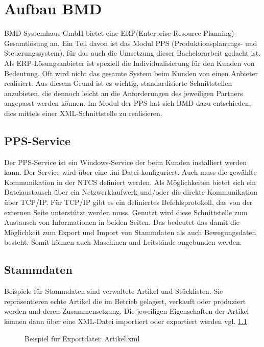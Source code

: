 \chapter{Aufbau BMD}
\label{cha:Bmd}

BMD Systemhaus GmbH bietet eine ERP(Enterprise Resource Planning)-Gesamtlösung an. Ein Teil davon ist das Modul PPS (Produktionsplanungs- und Steuerungssystem), für das auch die Umsetzung dieser Bachelorarbeit gedacht ist.
Als ERP-Lösungsanbieter ist speziell die Individualisierung für den Kunden von Bedeutung. Oft wird nicht das gesamte System beim Kunden von einen Anbieter realisiert. Aus diesem Grund ist es wichtig, standardisierte Schnittstellen anzubieten, die dennoch leicht an die Anforderungen des jeweiligen Partners angepasst werden können. Im Modul der PPS hat sich BMD dazu entschieden, dies mittels einer XML-Schnittstelle zu realisieren.

\section{PPS-Service}
Der PPS-Service  ist ein Windows-Service der beim Kunden installiert werden kann. Der Service wird über eine .ini-Datei konfiguriert. Auch muss die gewählte Kommunikation in der NTCS definiert werden. Als Möglichkeiten bietet sich ein Dateiaustausch über ein Netzwerklaufwerk und/oder die direkte Kommunikation über TCP/IP. Für TCP/IP gibt es ein definiertes Befehlsprotokoll, das von der externen Seite unterstützt werden muss.
Genutzt wird diese Schnittstelle zum Austausch von Informationen in beiden Seiten. Das bedeutet das damit die Möglichkeit zum Export und Import von Stammdaten als auch Bewegungsdaten besteht. Somit können auch Maschinen und Leitstände angebunden werden. 

\section{Stammdaten}
Beispiele für Stammdaten sind verwaltete Artikel und Stücklisten. Sie repräsentieren echte Artikel die im Betrieb gelagert, verkauft oder produziert werden und deren Zusammensetzung. Die jeweiligen Eigenschaften der Artikel können dann über eine XML-Datei importiert oder exportiert werden vgl. \ref{fig:ArtikelExp}

\begin{figure}
\centering
{}
    
\caption{Beispiel für Exportdatei: Artikel.xml  %
}
\label{fig:ArtikelExp}
\end{figure}


